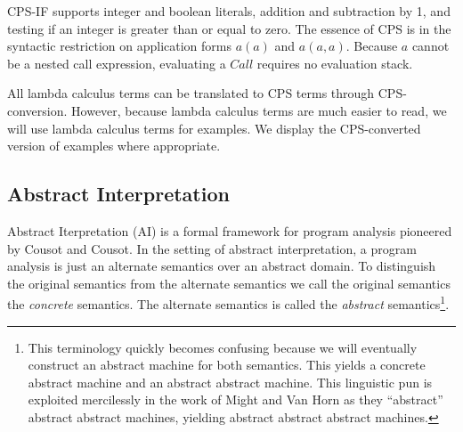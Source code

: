 \documentclass{article}
\begin{document}
CPS-IF supports integer and boolean literals, addition and subtraction by 1, and testing if an integer is greater than or equal to zero.
The essence of CPS is in the syntactic restriction on application forms $a(a)$ and $a(a,a)$.  
Because $a$ cannot be a nested call expression, evaluating a $Call$ requires no evaluation stack.

All lambda calculus terms can be translated to CPS terms through CPS-conversion.
However, because lambda calculus terms are much easier to read, we will use lambda calculus terms for examples.
We display the CPS-converted version of examples where appropriate.


\subsection{Abstract Interpretation}
\label{section:Background:AbstractInterpretation}

Abstract Iterpretation (AI) is a formal framework for program analysis pioneered by Cousot and Cousot.
In the setting of abstract interpretation, a program analysis is just an alternate semantics over an abstract domain.
To distinguish the original semantics from the alternate semantics we call the original semantics the \emph{concrete} semantics.
The alternate semantics is called the \emph{abstract} semantics\footnote{
  This terminology quickly becomes confusing because we will eventually construct an abstract machine for both semantics.
  This yields a concrete abstract machine and an abstract abstract machine. 
  This linguistic pun is exploited mercilessly in the work of Might and Van Horn as they “abstract” abstract abstract machines, yielding abstract abstract abstract machines.
}.
\end{document}
